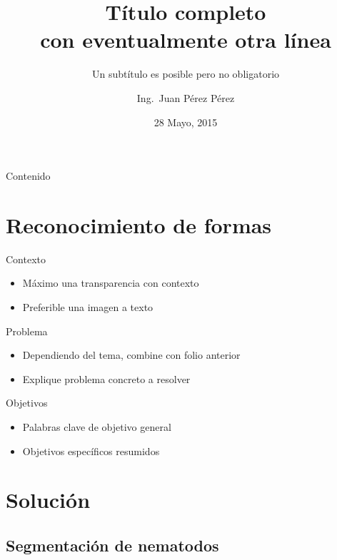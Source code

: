\documentclass[15pt]{beamer} %
\title[Título corto en cada imagen]{Título completo \\ con eventualmente otra línea}
\subtitle{Un subtítulo es posible pero no obligatorio}
\institute[TEC]{Escuela de Ingeniería Electrónica \\ Tecnológico de Costa Rica}
\date[Mayo 2015]{28 Mayo, 2015}
\author[J.\ Perez]{Ing.\ Juan Pérez Pérez}
\begin{document}
\graphicspath{{./}{./fig/}}

\begin{frame}
  \titlepage
\end{frame}


\begin{frame}{Contenido}
  \tableofcontents
\end{frame}

\section{Reconocimiento de formas}

\begin{frame}{Contexto}
  \begin{itemize}
  \item Máximo una transparencia con contexto
  \item Preferible una imagen a texto
  \end{itemize}
\end{frame}

\begin{frame}{Problema}
  
  \begin{itemize}
  \item Dependiendo del tema, combine con folio anterior
  \item Explique problema concreto a resolver
  \end{itemize}
\end{frame}

\begin{frame}{Objetivos}
  
  \begin{itemize}
  \item Palabras clave de objetivo general
  \item Objetivos específicos resumidos 
  \end{itemize}
\end{frame}


\section{Solución}

\subsection{Segmentación de nematodos}
\end{document}
